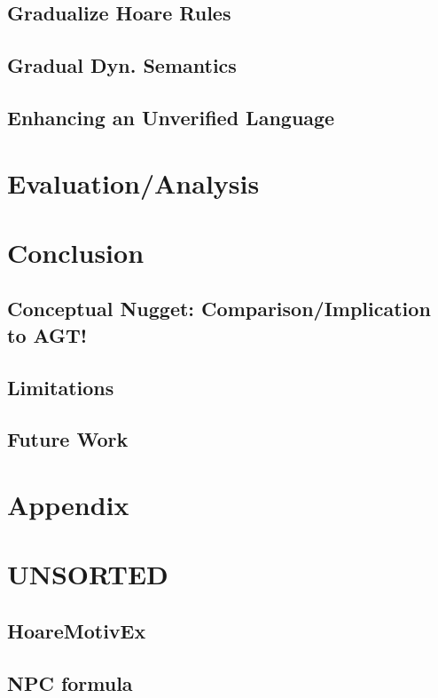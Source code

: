\section{Gradualize Hoare Rules}
\label{sec:gradualize-hoare-rules}


\section{Gradual Dyn. Semantics}


\section{Enhancing an Unverified Language}





\chapter{Evaluation/Analysis}
\label{ch:evaluation-analysis}


\chapter{Conclusion}
\label{ch:conclusion}


\section{Conceptual Nugget: Comparison/Implication to AGT!}

\section{Limitations}
\label{sec:limitations}


\section{Future Work}
\label{sec:future-work}


\chapter{Appendix}


\chapter{UNSORTED}

\section{HoareMotivEx}
\label{sec:hoaremotivex}


\section{NPC formula}
\label{sec:npc-formula}
